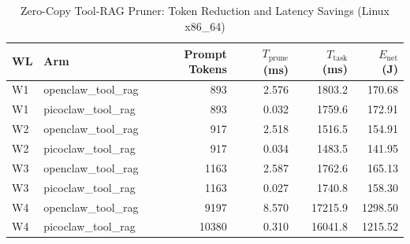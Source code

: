 \begin{table}[t]
\centering\small
\caption{Zero-Copy Tool-RAG Pruner: Token Reduction and Latency Savings (Linux x86_64)}
\label{tab:linux_tool_rag}
\begin{tabular}{llrrrr}
\toprule
WL & Arm & Prompt Tokens & $T_{\text{prune}}$ (ms) & $T_{\text{task}}$ (ms) & $E_{\text{net}}$ (J) \\
\midrule
W1 & openclaw\_tool\_rag & 893 & 2.576 & 1803.2 & 170.68 \\
W1 & picoclaw\_tool\_rag & 893 & 0.032 & 1759.6 & 172.91 \\
W2 & openclaw\_tool\_rag & 917 & 2.518 & 1516.5 & 154.91 \\
W2 & picoclaw\_tool\_rag & 917 & 0.034 & 1483.5 & 141.95 \\
W3 & openclaw\_tool\_rag & 1163 & 2.587 & 1762.6 & 165.13 \\
W3 & picoclaw\_tool\_rag & 1163 & 0.027 & 1740.8 & 158.30 \\
W4 & openclaw\_tool\_rag & 9197 & 8.570 & 17215.9 & 1298.50 \\
W4 & picoclaw\_tool\_rag & 10380 & 0.310 & 16041.8 & 1215.52 \\
\bottomrule
\end{tabular}
\end{table}
